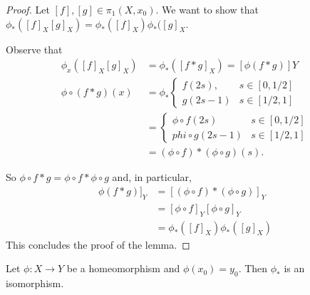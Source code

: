 \begin{proof}
	Let $[f],[g]\in \pi_1(X,x_0).$ We want to show that $\phi_*([f]_X[g]_X)=\phi_*([f]_X)\phi_*([g]_X$.
	
	Observe that 
	\begin{align*}
		\phi_x([f]_X[g]_X) &= \phi_*([f*g]_X)=[\phi(f*g)]Y \\
		\phi\circ (f*g)(x) &=\phi_* 
		\begin{cases}
			f(2s), &s\in [0,1/2]\\
			g(2s-1) & s\in [1/2,1] 
		\end{cases}
		\\
		&= 
		\begin{cases}
			\phi\circ f(2s) & s\in [0,1/2]\\
			phi\circ g(2s-1) & s\in [1/2,1] 
		\end{cases}
		\\
		&=(\phi\circ f)*(\phi\circ g)(s). 
	\end{align*}
	
	So $\phi\circ f * g=\phi\circ f * \phi\circ g$ and, in particular, 
	\begin{align*}
		\phi(f*g)]_Y &= [(\phi\circ f)*(\phi\circ g)]_Y\\
		& =[\phi\circ f]_Y[\phi\circ g]_Y\\
		& =\phi_*([f]_X)\phi_*([g]_X) 
	\end{align*}
	This concludes the proof of the lemma. 
\end{proof}
\begin{theorem}
	Let $\phi:X\to Y$ be a homeomorphism and $\phi(x_0)=y_0$. Then $\phi_*$ is an isomorphism. 
\end{theorem}

